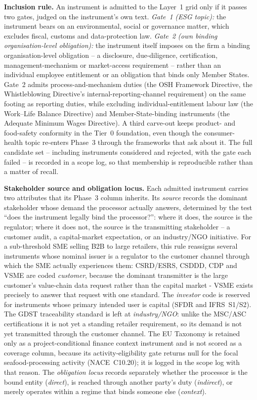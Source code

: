 \documentclass[
]{article}
\begin{document}
\textbf{Inclusion rule.} An instrument is admitted to the Layer~1 grid
only if it passes two gates, judged on the instrument's own text.
\emph{Gate~1 (ESG topic):}
the instrument bears on an environmental, social or governance matter,
which excludes fiscal, customs and data-protection law. \emph{Gate~2 (own
binding organisation-level obligation):} the instrument itself imposes on
the firm a binding organisation-level obligation -- a disclosure,
due-diligence, certification, management-mechanism or market-access
requirement -- rather than an individual employee entitlement or an
obligation that binds only Member States. Gate~2 admits
process-and-mechanism duties (the OSH Framework Directive, the
Whistleblowing Directive's internal-reporting-channel requirement) on the
same footing as reporting duties, while excluding individual-entitlement
labour law (the Work--Life Balance Directive) and Member-State-binding
instruments (the Adequate Minimum Wages Directive). A third carve-out
keeps product- and food-safety conformity in the Tier~0 foundation, even
though the consumer-health topic re-enters Phase~3 through the frameworks
that ask about it. The full candidate set -- including instruments
considered and rejected, with the gate each failed -- is recorded in a
scope log, so that membership is reproducible rather than a matter of
recall.

\textbf{Stakeholder source and obligation locus.} Each admitted
instrument carries two attributes that its Phase~3 column inherits. Its
\emph{source} records the dominant stakeholder whose demand the processor
actually answers, determined by the test ``does the instrument legally
bind the processor?'': where it does, the source is the regulator; where
it does not, the source is the transmitting stakeholder -- a customer
audit, a capital-market expectation, or an industry/NGO initiative. For a
sub-threshold SME selling B2B to large retailers, this rule reassigns
several instruments whose nominal issuer is a regulator to the customer
channel through which the SME actually experiences them: CSRD/ESRS,
CSDDD, CDP and VSME are coded \emph{customer}, because the dominant
transmitter is the large customer's value-chain data request rather than
the capital market - VSME exists precisely to answer that request with
one standard. The \emph{investor} code is reserved for instruments whose
primary intended user is capital (SFDR and IFRS~S1/S2). The GDST
traceability standard is left at \emph{industry/NGO}: unlike the MSC/ASC
certifications it is not yet a standing retailer requirement, so its
demand is not yet transmitted through the customer channel. The EU Taxonomy is retained only as a project-conditional
finance context instrument and is not scored as a coverage column,
because its activity-eligibility gate returns null for the focal
seafood-processing activity (NACE~C10.20); it is logged in the scope log
with that reason. The \emph{obligation locus} records separately whether
the processor is the bound entity (\emph{direct}), is reached through
another party's duty (\emph{indirect}), or merely operates within a
regime that binds someone else (\emph{context}).
\end{document}
